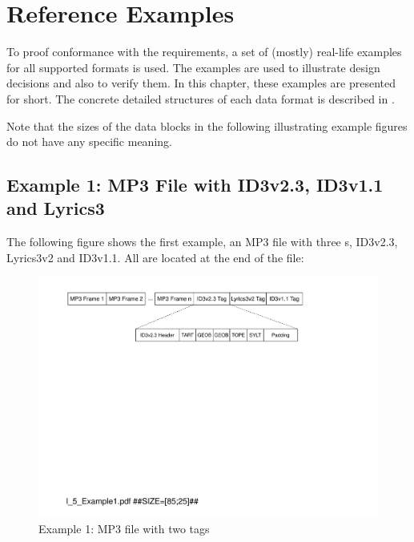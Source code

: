 
\chapter{Reference Examples}
\label{sec:ReferenceExamples}

To proof conformance with the \LibName{} requirements, a set of (mostly) real-life examples for all supported formats is used. The examples are used to illustrate design decisions and also to verify them. In this chapter, these examples are presented for short. The concrete detailed structures of each data format is described in \cite{MetadataCompendium}.

Note that the sizes of the data blocks in the following illustrating example figures do not have any specific meaning.


\section{Example 1: MP3 File with ID3v2.3, ID3v1.1 and Lyrics3}
\label{sec:Example1MP3FileWithID3v23AndID3v11}

The following figure shows the first example, an MP3 file with three \TERMtag{}s, ID3v2.3, Lyrics3v2 and ID3v1.1. All are located at the end of the file:

\begin{figure}[H]
	\centering
	\includegraphics[width=1.00\textwidth]{Figures/Part_I/I_5_Example1.pdf}
	\caption{Example 1: MP3 file with two tags}
	\label{fig:Example1MP3filewithtwotags}
\end{figure}

